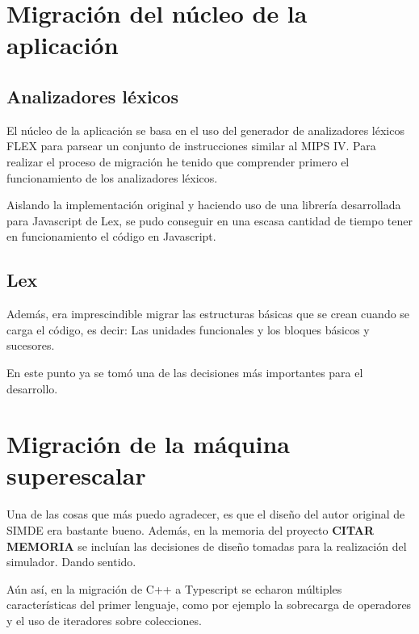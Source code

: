 

\section{Migración del núcleo de la aplicación}
\label{5:sec1} 

\subsection{Analizadores léxicos}
El núcleo de la aplicación se basa en el uso del generador de analizadores 
léxicos FLEX para parsear un conjunto de instrucciones similar al MIPS IV. 
Para realizar el proceso de migración he tenido que comprender primero el 
funcionamiento de los analizadores léxicos.

Aislando la implementación original y haciendo uso de una librería desarrollada para Javascript de Lex,
se pudo conseguir en una escasa cantidad de tiempo tener en funcionamiento el código en Javascript.

\subsection{Lex}
Además, era imprescindible migrar las estructuras básicas que se crean cuando se carga el código, 
es decir: Las unidades funcionales y los bloques básicos y sucesores.

En este punto ya se tomó una de las decisiones más importantes para el desarrollo. 


\section{Migración de la máquina superescalar}
\label{5:sec2} 

Una de las cosas que más puedo agradecer, es que el diseño del autor original de SIMDE era bastante 
bueno. Además, en la memoria del proyecto \textbf{CITAR MEMORIA} se incluían las decisiones de diseño
tomadas para la realización del simulador. Dando sentido.

\bigskip
Aún así, en la migración de C++ a Typescript se echaron múltiples características del primer lenguaje,
como por ejemplo la sobrecarga de operadores y el uso de iteradores sobre colecciones.

